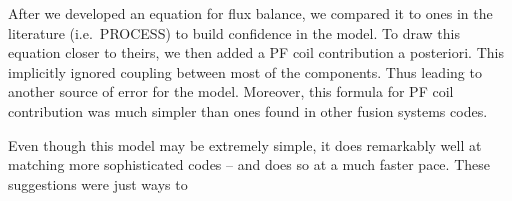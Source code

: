 After we developed an equation for flux balance, we compared it to ones in the literature (i.e.\ PROCESS) to build confidence in the model. To draw this equation closer to theirs, we then added a PF coil contribution a posteriori. This implicitly ignored coupling between most of the components. Thus leading to another source of error for the model. Moreover, this formula for PF coil contribution was much simpler than ones found in other fusion systems codes.

Even though this model may be extremely simple, it does remarkably well at matching more sophisticated codes -- and does so at a much faster pace. These suggestions were  just ways to 

%
